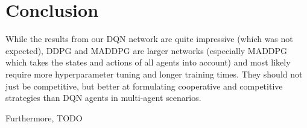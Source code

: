 
\section{Conclusion}
\label{sec:conclusion}

While the results from our DQN network are quite impressive (which was not expected), DDPG and MADDPG are larger networks (especially MADDPG which takes the states and actions of all agents into account) and most likely require more hyperparameter tuning and longer training times. They should not just be competitive, but better at formulating cooperative and competitive strategies than DQN agents in multi-agent scenarios.

Furthermore, TODO 

